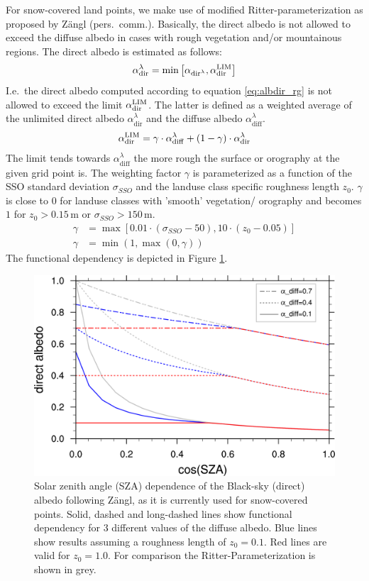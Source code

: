 \documentclass[a4paper,11pt]{article}
\begin{document}
For snow-covered land points, we make use of modified Ritter-parameterization as proposed by Z\"angl 
(pers.\ comm.). Basically, the direct albedo is not allowed to exceed the diffuse albedo in cases with rough vegetation 
and/or mountainous regions. The direct albedo is estimated as follows:
\begin{align}
 \alpha_{\mathrm{dir}}^{\lambda} = \min\left[\alpha_{\mathrm{dir}^{\lambda}},\alpha_{\mathrm{dir}}^{\rm LIM}\right]
\end{align}
I.e.\ the direct albedo computed according to equation \eqref{eq:albdir_rg} is not allowed to exceed the 
limit $\alpha_{\mathrm{dir}}^{\rm LIM}$. The latter is defined as a weighted average of the unlimited direct  
albedo $\alpha_{\mathrm{dir}}^{\lambda}$ and the diffuse albedo $\alpha_{\mathrm{diff}}^{\lambda}$.
\begin{align}
 \alpha_{\mathrm{dir}}^{\rm LIM} = \gamma \cdot \alpha_{\mathrm{diff}}^{\lambda} + (1-\gamma)\cdot \alpha_{\mathrm{dir}}^{\lambda}
\end{align}
The limit tends towards $\alpha_{\mathrm{diff}}^{\lambda}$ the more rough the surface or orography at the given grid point is. 
The weighting factor $\gamma$ is parameterized as a function of the SSO standard deviation $\sigma_{SSO}$ and 
the landuse class specific roughness length $z_{0}$. $\gamma$ is close to $0$ for landuse classes with 'smooth' vegetation/ orography 
and becomes $1$ for $z_{0}>0.15\,\mathrm{m}$ or $\sigma_{SSO}>150\,\mathrm{m}$.
\begin{align}
 \gamma &= \max\left[0.01\cdot (\sigma_{SSO}-50),10\cdot(z_{0}-0.05)\right]\\
 \gamma &= \min(1,\max(0,\gamma))
\end{align}
The functional dependency is depicted in Figure \ref{fig:albdir_Zaengl}.
\begin{figure}[hbt]
  \centering
  \includegraphics[width=12.0cm]{direct_albedo_Zaengl.png}
  \caption{Solar zenith angle (SZA) dependence of the Black-sky (direct) albedo following Z\"angl, as it is currently 
  used for snow-covered points. Solid, dashed and long-dashed lines show functional dependency for $3$ different 
  values of the  diffuse albedo. Blue lines show results assuming a roughness length of $z_{0}=0.1$. Red lines are 
  valid for $z_{0}=1.0$. For comparison the Ritter-Parameterization is shown in grey.}\label{fig:albdir_Zaengl}
\end{figure}
\end{document}
